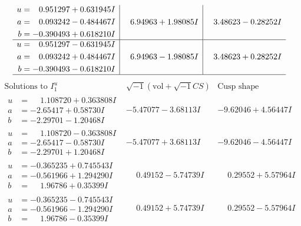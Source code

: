 \documentclass[1p]{elsarticle_modified}
\theoremstyle{definition}
\newcommand{\I}{\sqrt{-1}}
\begin{document}
$$\begin{array}{c|c|c}
\begin{aligned}
u &= \phantom{-}0.951297 + 0.631945 I \\
a &= \phantom{-}0.093242 - 0.484467 I \\
b &= -0.390493 + 0.618210 I\end{aligned}
 & \phantom{-}6.94963 + 1.98085 I & \phantom{-}3.48623 - 0.28252 I \\ \hline\begin{aligned}
u &= \phantom{-}0.951297 - 0.631945 I \\
a &= \phantom{-}0.093242 + 0.484467 I \\
b &= -0.390493 - 0.618210 I\end{aligned}
 & \phantom{-}6.94963 - 1.98085 I & \phantom{-}3.48623 + 0.28252 I\\
 \hline 
 \end{array}$$\newpage$$\begin{array}{c|c|c}  
\text{Solutions to }I^u_{1}& \I (\text{vol} + \sqrt{-1}CS) & \text{Cusp shape}\\
 \hline 
\begin{aligned}
u &= \phantom{-}1.108720 + 0.363808 I \\
a &= -2.65417 + 0.58730 I \\
b &= -2.29701 - 1.20468 I\end{aligned}
 & -5.47077 - 3.68113 I & -9.62046 + 4.56447 I \\ \hline\begin{aligned}
u &= \phantom{-}1.108720 - 0.363808 I \\
a &= -2.65417 - 0.58730 I \\
b &= -2.29701 + 1.20468 I\end{aligned}
 & -5.47077 + 3.68113 I & -9.62046 - 4.56447 I \\ \hline\begin{aligned}
u &= -0.365235 + 0.745543 I \\
a &= -0.561966 + 1.294290 I \\
b &= \phantom{-}1.96786 + 0.35399 I\end{aligned}
 & \phantom{-}0.49152 - 5.74739 I & \phantom{-}0.29552 + 5.57964 I \\ \hline\begin{aligned}
u &= -0.365235 - 0.745543 I \\
a &= -0.561966 - 1.294290 I \\
b &= \phantom{-}1.96786 - 0.35399 I\end{aligned}
 & \phantom{-}0.49152 + 5.74739 I & \phantom{-}0.29552 - 5.57964 I \\ \hline\begin{aligned}

\end{aligned}
\end{array}$$
\end{document}
